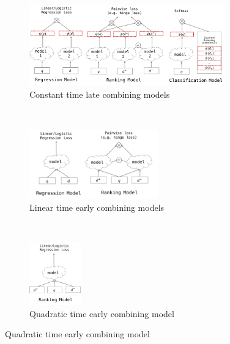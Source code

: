 \begin{figure}[t]
    \centering
    \begin{subfigure}[t]{0.5\textwidth}
        \centering
        \includegraphics[height=3.5cm]{Images/O_1_Models.png}
        \caption{\label{fig:o_1_models}Constant time late combining models}
    \end{subfigure}%
    ~ 
    \begin{subfigure}[t]{0.25\textwidth}
        \centering
        \includegraphics[height=3cm]{Images/O_n_Models.png}
        \caption{\label{fig:o_n_models}Linear time early combining models}
    \end{subfigure}%
    ~
    \begin{subfigure}[t]{0.20\textwidth}
        \centering
        \includegraphics[height=2.7cm]{Images/O_n2_Models.png}
        \caption{\label{fig:o_n2_models}Quadratic time early combining model}
    \end{subfigure}%
\end{figure}


